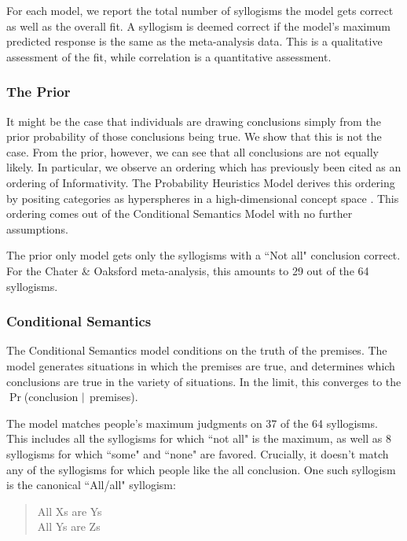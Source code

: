 \documentclass[10pt,letterpaper]{article}
\begin{document}
For each model, we report the total number of syllogisms the model gets correct as well as the overall fit. A syllogism is deemed correct if the model's maximum predicted response is the same as the meta-analysis data. This is a qualitative assessment of the fit, while correlation is a quantitative assessment. 

\subsubsection{The Prior}
It might be the case that individuals are drawing conclusions simply from the prior probability of those conclusions being true. We show that this is not the case. From the prior, however, we can see that all conclusions are not equally likely. In particular, we observe an ordering which has previously been cited as an ordering of Informativity. The Probability Heuristics Model derives this ordering by positing categories as hyperspheres in a high-dimensional concept space \cite{Chater1999}. This ordering comes out of the Conditional Semantics Model with no further assumptions.

The prior only model gets only the syllogisms with a ``Not all" conclusion correct. For the Chater \& Oaksford meta-analysis, this amounts to 29 out of the 64 syllogisms.

\subsubsection{Conditional Semantics}

The Conditional Semantics model conditions on the truth of the premises. The model generates situations in which the premises are true, and determines which conclusions are true in the variety of situations. In the limit, this converges to the $\Pr$(conclusion $\arrowvert$ premises). 

The model matches people's maximum judgments on 37 of the 64 syllogisms. This includes all the syllogisms for which ``not all" is the maximum, as well as 8 syllogisms for which ``some" and ``none" are favored. Crucially, it doesn't match any of the syllogisms for which people like the all conclusion. One such syllogism is the canonical ``All/all" syllogism:

\begin{quote}
All Xs are Ys \\
All Ys are Zs \\
\end{quote}
\end{document}
